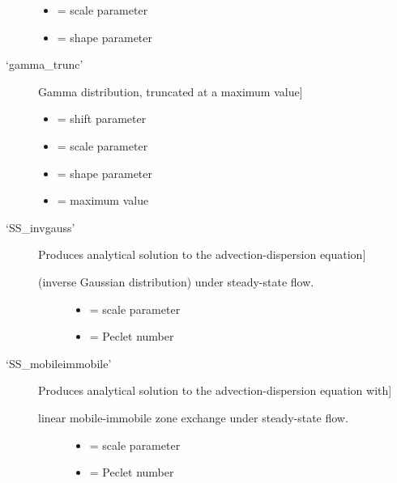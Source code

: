 \documentclass[letterpaper,10pt,english]{sphinxmanual}
\begin{document}
\begin{fulllineitems}
\begin{description}
\begin{itemize}
\item {} 
 = scale parameter

\item {} 
 = shape parameter

\end{itemize}

\item[{`gamma\_trunc'}] \leavevmode{[}Gamma distribution, truncated at a maximum value{]}\begin{itemize}
\item {} 
 = shift parameter

\item {} 
 = scale parameter

\item {} 
 = shape parameter

\item {} 
 = maximum value

\end{itemize}

\item[{`SS\_invgauss'}] \leavevmode{[}Produces analytical solution to the advection-dispersion equation{]}\begin{description}
\item[{(inverse Gaussian distribution) under steady-state flow.}] \leavevmode\begin{itemize}
\item {} 
 = scale parameter

\item {} 
 = Peclet number

\end{itemize}

\end{description}

\item[{`SS\_mobileimmobile'}] \leavevmode{[}Produces analytical solution to the advection-dispersion equation with{]}\begin{description}
\item[{linear mobile-immobile zone exchange under steady-state flow.}] \leavevmode\begin{itemize}
\item {} 
 = scale parameter

\item {} 
 = Peclet number


\end{itemize}
\end{description}
\end{description}
\end{fulllineitems}
\end{document}
